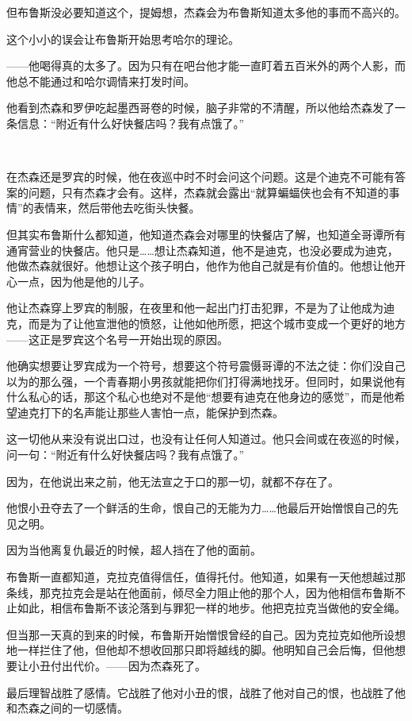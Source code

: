 \documentclass[../main.tex]{subfiles}
\begin{document}
但布鲁斯没必要知道这个，提姆想，杰森会为布鲁斯知道太多他的事而不高兴的。

这个小小的误会让布鲁斯开始思考哈尔的理论。

——他喝得真的太多了。因为只有在吧台他才能一直盯着五百米外的两个人影，而他总不能通过和哈尔调情来打发时间。

他看到杰森和罗伊吃起墨西哥卷的时候，脑子非常的不清醒，所以他给杰森发了一条信息：“附近有什么好快餐店吗？我有点饿了。”

~\

在杰森还是罗宾的时候，他在夜巡中时不时会问这个问题。这是个迪克不可能有答案的问题，只有杰森才会有。这样，杰森就会露出“就算蝙蝠侠也会有不知道的事情”的表情来，然后带他去吃街头快餐。

但其实布鲁斯什么都知道，他知道杰森会对哪里的快餐店了解，也知道全哥谭所有通宵营业的快餐店。他只是……想让杰森知道，他不是迪克，也没必要成为迪克，他做杰森就很好。他想让这个孩子明白，他作为他自己就是有价值的。他想让他开心一点，因为他是他的儿子。

他让杰森穿上罗宾的制服，在夜里和他一起出门打击犯罪，不是为了让他成为迪克，而是为了让他宣泄他的愤怒，让他如他所愿，把这个城市变成一个更好的地方——这正是罗宾这个名号一开始出现的原因。

他确实想要让罗宾成为一个符号，想要这个符号震慑哥谭的不法之徒：你们没自己以为的那么强，一个青春期小男孩就能把你们打得满地找牙。但同时，如果说他有什么私心的话，那这个私心也绝对不是他“想要有迪克在他身边的感觉”，而是他希望迪克打下的名声能让那些人害怕一点，能保护到杰森。

这一切他从来没有说出口过，也没有让任何人知道过。他只会间或在夜巡的时候，问一句：“附近有什么好快餐店吗？我有点饿了。”

因为，在他说出来之前，他无法宣之于口的那一切，就都不存在了。

他恨小丑夺去了一个鲜活的生命，恨自己的无能为力……他最后开始憎恨自己的先见之明。

因为当他离复仇最近的时候，超人挡在了他的面前。

布鲁斯一直都知道，克拉克值得信任，值得托付。他知道，如果有一天他想越过那条线，那克拉克会是站在他面前，倾尽全力阻止他的那个人，因为他相信布鲁斯不止如此，相信布鲁斯不该沦落到与罪犯一样的地步。他把克拉克当做他的安全绳。

但当那一天真的到来的时候，布鲁斯开始憎恨曾经的自己。因为克拉克如他所设想地一样拦住了他，但他却不想收回那只即将越线的脚。他明知自己会后悔，但他想要让小丑付出代价。——因为杰森死了。

最后理智战胜了感情。它战胜了他对小丑的恨，战胜了他对自己的恨，也战胜了他和杰森之间的一切感情。
\end{document}

